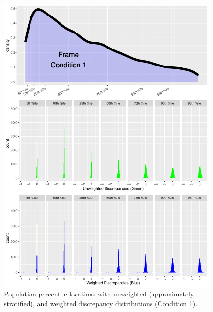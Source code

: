 \documentclass[
  ,man]{apa6}
\begin{document}
\begin{figure}
\centering
\includegraphics{NormsBuilding_files/figure-latex/Figure3-1.pdf}
\caption{\label{fig:Figure3}Population percentile locations with unweighted (approximately stratified), and weighted discrepancy distributions (Condition 1).}
\end{figure}
\end{document}
